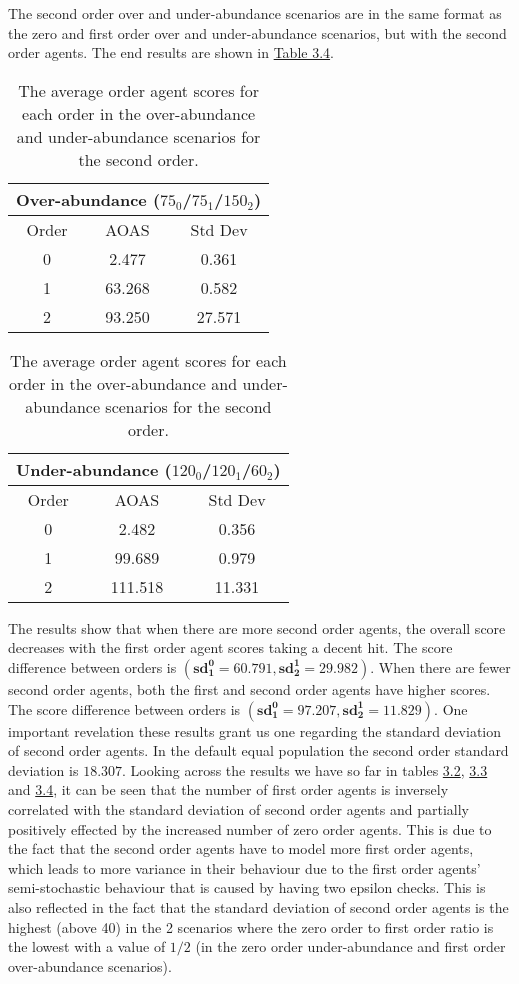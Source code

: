 The second order over and under-abundance scenarios are in the same format as the zero and first order over and under-abundance scenarios, but with the second order agents. The end results are shown in \hyperref[table:non-sig-second-order-simple]{Table 3.4}.

\begin{table}[h]
\centering
\begin{tabular}{|c|c|c|}
\hline
\multicolumn{3}{|c|}{Over-abundance ($75_{0}$/$75_{1}$/$150_{2}$)} \\
\hline
Order & AOAS & Std Dev \\
\hline
0     & 2.477   & 0.361    \\
1     & 63.268  & 0.582    \\
2     & 93.250  & 27.571   \\
\hline
\end{tabular}
\qquad
\begin{tabular}{|c|c|c|}
\hline
\multicolumn{3}{|c|}{Under-abundance ($120_{0}$/$120_{1}$/$60_{2}$)} \\
\hline
Order & AOAS & Std Dev \\
\hline
0     & 2.482   & 0.356   \\
1     & 99.689  & 0.979  \\
2     & 111.518 & 11.331 \\
\hline
\end{tabular}
\caption{The average order agent scores for each order in the over-abundance and under-abundance scenarios for the second order.}
\label{table:non-sig-second-order-simple}
\end{table}

The results show that when there are more second order agents, the overall score decreases with the first order agent scores taking a decent hit. The score difference between orders is $(\mathbf{sd^0_1 = 60.791}, \mathbf{sd^1_2 = 29.982})$. When there are fewer second order agents, both the first and second order agents have higher scores. The score difference between orders is $(\mathbf{sd^0_1 = 97.207}, \mathbf{sd^1_2 = 11.829})$. One important revelation these results grant us one regarding the standard deviation of second order agents. In the default equal population the second order standard deviation is $\mathbf{18.307}$. Looking across the results we have so far in tables \hyperref[table:non-sig-zero-order-simple]{3.2}, \hyperref[table:non-sig-first-order-simple]{3.3} and \hyperref[table:non-sig-second-order-simple]{3.4}, it can be seen that the number of first order agents is inversely correlated with the standard deviation of second order agents and partially positively effected by the increased number of zero order agents. This is due to the fact that the second order agents have to model more first order agents, which leads to more variance in their behaviour due to the first order agents' semi-stochastic behaviour that is caused by having two epsilon checks. This is also reflected in the fact that the standard deviation of second order agents is the highest (above 40) in the 2 scenarios where the zero order to first order ratio is the lowest with a value of $1/2$ (in the zero order under-abundance and first order over-abundance scenarios). 